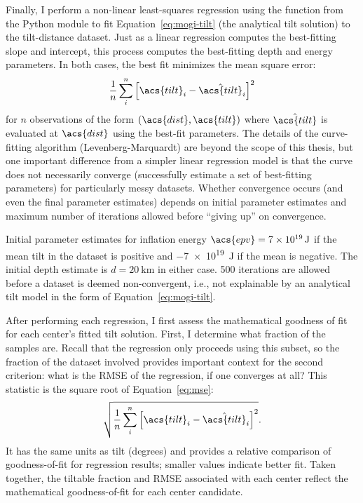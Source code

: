Finally, I perform a non-linear least-squares regression using the  function from the  Python module \parencite{2020SciPy-NMeth} to fit Equation~\eqref{eq:mogi-tilt} (the analytical tilt solution) to the tilt-distance dataset. Just as a linear regression computes the best-fitting slope and intercept, this process computes the best-fitting depth and energy parameters. In both cases, the best fit minimizes the mean square error:
\begin{equation}
    \frac{1}{n}\sum_{i}^{n}{\left[\acs{tilt}_i-\hat{\acs{tilt}}_i\right]}^2\label{eq:mse}
\end{equation}
for $n$ observations of the form $(\acs{dist}, \acs{tilt})$ where $\hat{\acs{tilt}}$ is evaluated at $\acs{dist}$ using the best-fit parameters. The details of the curve-fitting algorithm (Levenberg-Marquardt) are beyond the scope of this thesis, but one important difference from a simpler linear regression model is that the curve does not necessarily converge (successfully estimate a set of best-fitting parameters) for particularly messy datasets. Whether convergence occurs (and even the final parameter estimates) depends on initial parameter estimates and maximum number of iterations allowed before ``giving up'' on convergence.

Initial parameter estimates for inflation energy $\acs{epv} = \qty{7e19}{\J}$ if the mean tilt in the dataset is positive and \qty{-7e19}{\J} if the mean is negative. The initial depth estimate is $d = \qty{20}{\km}$ in either case. 500 iterations are allowed before a dataset is deemed non-convergent, i.e., not explainable by an analytical tilt model in the form of Equation~\eqref{eq:mogi-tilt}.

After performing each regression, I first assess the mathematical goodness of fit for each center's fitted tilt solution. First, I determine what fraction of the samples are. Recall that the regression only proceeds using this subset, so the fraction of the dataset involved provides important context for the second criterion: what is the \ac{RMSE} of the regression, if one converges at all? This statistic is the square root of Equation~\eqref{eq:mse}:
\begin{equation}
    \sqrt{\frac{1}{n}\sum_{i}^{n}{\left[\acs{tilt}_i-\hat{\acs{tilt}}_i\right]}^2}.\label{eq:rmse}
\end{equation}
It has the same units as \acs{tilt} (degrees) and provides a relative comparison of goodness-of-fit for regression results; smaller values indicate better fit. Taken together, the tiltable fraction and \ac{RMSE} associated with each center reflect the mathematical goodness-of-fit for each center candidate.

